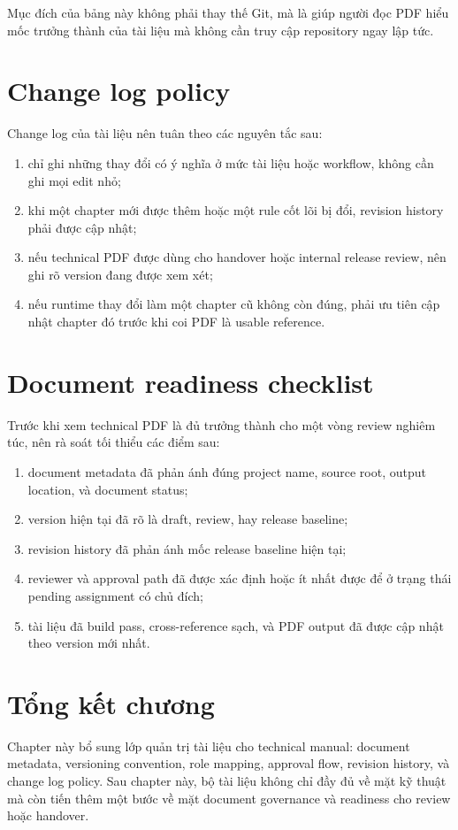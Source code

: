 Mục đích của bảng này không phải thay thế Git, mà là giúp người đọc PDF hiểu mốc trưởng thành của tài liệu mà không cần truy cập repository ngay lập tức.

\section{Change log policy}

Change log của tài liệu nên tuân theo các nguyên tắc sau:

\begin{enumerate}[label=-]
\item chỉ ghi những thay đổi có ý nghĩa ở mức tài liệu hoặc workflow, không cần ghi mọi edit nhỏ;
\item khi một chapter mới được thêm hoặc một rule cốt lõi bị đổi, revision history phải được cập nhật;
\item nếu technical PDF được dùng cho handover hoặc internal release review, nên ghi rõ version đang được xem xét;
\item nếu runtime thay đổi làm một chapter cũ không còn đúng, phải ưu tiên cập nhật chapter đó trước khi coi PDF là usable reference.
\end{enumerate}

\section{Document readiness checklist}

Trước khi xem technical PDF là đủ trưởng thành cho một vòng review nghiêm túc, nên rà soát tối thiểu các điểm sau:

\begin{enumerate}[label=-]
\item document metadata đã phản ánh đúng project name, source root, output location, và document status;
\item version hiện tại đã rõ là draft, review, hay release baseline;
\item revision history đã phản ánh mốc release baseline hiện tại;
\item reviewer và approval path đã được xác định hoặc ít nhất được để ở trạng thái pending assignment có chủ đích;
\item tài liệu đã build pass, cross-reference sạch, và PDF output đã được cập nhật theo version mới nhất.
\end{enumerate}

\section{Tổng kết chương}

Chapter này bổ sung lớp quản trị tài liệu cho technical manual: document metadata, versioning convention, role mapping, approval flow, revision history, và change log policy. Sau chapter này, bộ tài liệu không chỉ đầy đủ về mặt kỹ thuật mà còn tiến thêm một bước về mặt document governance và readiness cho review hoặc handover.
